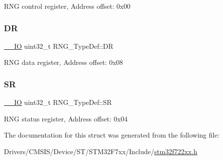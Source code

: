 R\+NG control register, Address offset\+: 0x00 \mbox{\label{struct_r_n_g___type_def_a89f3352fb11cca430aaecc0c9b49c6d3}} 
\subsubsection{\texorpdfstring{DR}{DR}}
{\footnotesize\ttfamily \mbox{\hyperlink{core__sc300_8h_aec43007d9998a0a0e01faede4133d6be}{\+\_\+\+\_\+\+IO}} uint32\+\_\+t R\+N\+G\+\_\+\+Type\+Def\+::\+DR}

R\+NG data register, Address offset\+: 0x08 \mbox{\label{struct_r_n_g___type_def_a4e4c38cd6a078fea5f9fa5e31bc0d326}} 
\subsubsection{\texorpdfstring{SR}{SR}}
{\footnotesize\ttfamily \mbox{\hyperlink{core__sc300_8h_aec43007d9998a0a0e01faede4133d6be}{\+\_\+\+\_\+\+IO}} uint32\+\_\+t R\+N\+G\+\_\+\+Type\+Def\+::\+SR}

R\+NG status register, Address offset\+: 0x04 

The documentation for this struct was generated from the following file\+:\begin{DoxyCompactItemize}
\item 
Drivers/\+C\+M\+S\+I\+S/\+Device/\+S\+T/\+S\+T\+M32\+F7xx/\+Include/\mbox{\hyperlink{stm32f722xx_8h}{stm32f722xx.\+h}}\end{DoxyCompactItemize}

